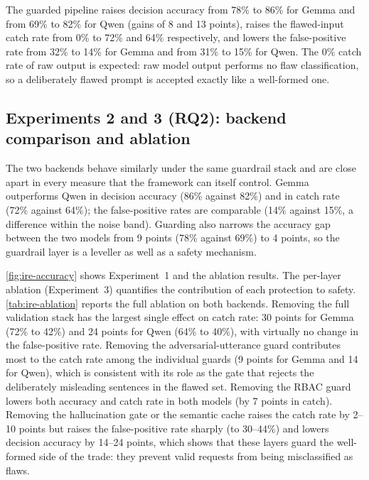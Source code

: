 The guarded pipeline raises decision accuracy from 78\% to 86\% for Gemma and
from 69\% to 82\% for Qwen (gains of 8 and 13 points), raises the flawed-input
catch rate from 0\% to 72\% and 64\% respectively, and lowers the
false-positive rate from 32\% to 14\% for Gemma and from 31\% to 15\% for Qwen.
The 0\% catch rate of raw output is expected: raw model output performs no flaw
classification, so a deliberately flawed prompt is accepted exactly like a
well-formed one.

\subsection{Experiments 2 and 3 (RQ2): backend comparison and ablation}\label{sec:results-ire-exp23}

The two backends behave similarly under the same guardrail stack and are close
apart in every measure that the framework can itself control. Gemma outperforms
Qwen in decision accuracy (86\% against 82\%) and in catch rate (72\% against
64\%); the false-positive rates are comparable (14\% against 15\%, a difference
within the noise band). Guarding also narrows the accuracy gap between the two
models from 9 points (78\% against 69\%) to 4 points, so the guardrail layer is
a leveller as well as a safety mechanism.

\cref{fig:ire-accuracy} shows Experiment~1 and the ablation results. The
per-layer ablation (Experiment~3) quantifies the contribution of each protection
to safety. \cref{tab:ire-ablation} reports the full ablation on both backends.
Removing the full validation stack has the largest single effect on catch rate:
30 points for Gemma (72\% to 42\%) and 24 points for Qwen (64\% to 40\%), with
virtually no change in the false-positive rate. Removing the adversarial-utterance
guard contributes most to the catch rate among the individual guards (9 points
for Gemma and 14 for Qwen), which is consistent with its role as the gate that
rejects the deliberately misleading sentences in the flawed set. Removing the
RBAC guard lowers both accuracy and catch rate in both models (by 7 points in
catch). Removing the hallucination gate or the semantic cache raises the catch
rate by 2--10 points but raises the false-positive rate sharply (to 30--44\%)
and lowers decision accuracy by 14--24 points, which shows that these layers
guard the well-formed side of the trade: they prevent valid requests from being
misclassified as flaws.

